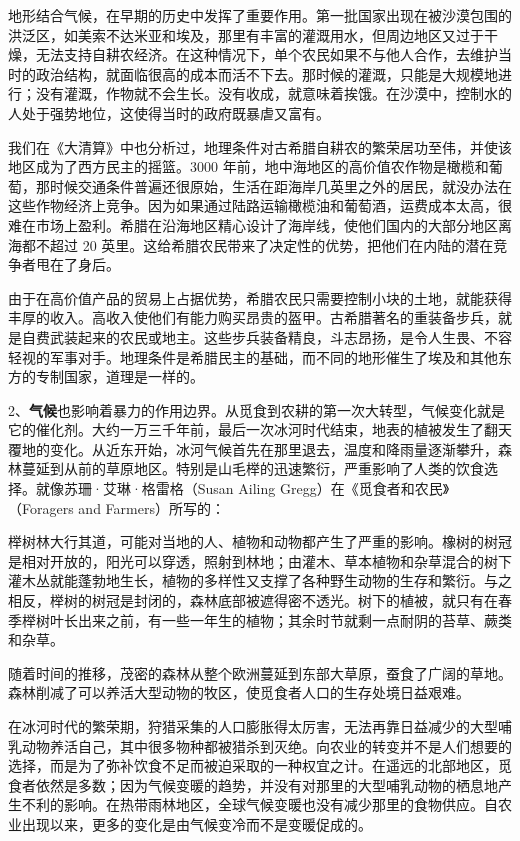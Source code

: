 地形结合气候，在早期的历史中发挥了重要作用。第一批国家出现在被沙漠包围的洪泛区，如美索不达米亚和埃及，那里有丰富的灌溉用水，但周边地区又过于干燥，无法支持自耕农经济。在这种情况下，单个农民如果不与他人合作，去维护当时的政治结构，就面临很高的成本而活不下去。那时候的灌溉，只能是大规模地进行；没有灌溉，作物就不会生长。没有收成，就意味着挨饿。在沙漠中，控制水的人处于强势地位，这使得当时的政府既暴虐又富有。

我们在《大清算》中也分析过，地理条件对古希腊自耕农的繁荣居功至伟，并使该地区成为了西方民主的摇篮。3000 年前，地中海地区的高价值农作物是橄榄和葡萄，那时候交通条件普遍还很原始，生活在距海岸几英里之外的居民，就没办法在这些作物经济上竞争。因为如果通过陆路运输橄榄油和葡萄酒，运费成本太高，很难在市场上盈利。希腊在沿海地区精心设计了海岸线，使他们国内的大部分地区离海都不超过 20 英里。这给希腊农民带来了决定性的优势，把他们在内陆的潜在竞争者甩在了身后。

由于在高价值产品的贸易上占据优势，希腊农民只需要控制小块的土地，就能获得丰厚的收入。高收入使他们有能力购买昂贵的盔甲。古希腊著名的重装备步兵，就是自费武装起来的农民或地主。这些步兵装备精良，斗志昂扬，是令人生畏、不容轻视的军事对手。地理条件是希腊民主的基础，而不同的地形催生了埃及和其他东方的专制国家，道理是一样的。

2、\textbf{气候}也影响着暴力的作用边界。从觅食到农耕的第一次大转型，气候变化就是它的催化剂。大约一万三千年前，最后一次冰河时代结束，地表的植被发生了翻天覆地的变化。从近东开始，冰河气候首先在那里退去，温度和降雨量逐渐攀升，森林蔓延到从前的草原地区。特别是山毛榉的迅速繁衍，严重影响了人类的饮食选择。就像苏珊·艾琳·格雷格（Susan Ailing Gregg）在《觅食者和农民》（Foragers and Farmers）所写的：


\begin{tcolorbox}
\kaishu 榉树林大行其道，可能对当地的人、植物和动物都产生了严重的影响。橡树的树冠是相对开放的，阳光可以穿透，照射到林地；由灌木、草本植物和杂草混合的树下灌木丛就能蓬勃地生长，植物的多样性又支撑了各种野生动物的生存和繁衍。与之相反，榉树的树冠是封闭的，森林底部被遮得密不透光。树下的植被，就只有在春季榉树叶长出来之前，有一些一年生的植物；其余时节就剩一点耐阴的苔草、蕨类和杂草。 
\end{tcolorbox}

随着时间的推移，茂密的森林从整个欧洲蔓延到东部大草原，蚕食了广阔的草地。森林削减了可以养活大型动物的牧区，使觅食者人口的生存处境日益艰难。

在冰河时代的繁荣期，狩猎采集的人口膨胀得太厉害，无法再靠日益减少的大型哺乳动物养活自己，其中很多物种都被猎杀到灭绝。向农业的转变并不是人们想要的选择，而是为了弥补饮食不足而被迫采取的一种权宜之计。在遥远的北部地区，觅食者依然是多数；因为气候变暖的趋势，并没有对那里的大型哺乳动物的栖息地产生不利的影响。在热带雨林地区，全球气候变暖也没有减少那里的食物供应。自农业出现以来，更多的变化是由气候变冷而不是变暖促成的。

